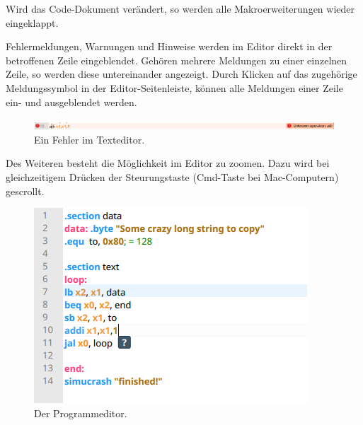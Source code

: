 Wird das Code-Dokument verändert, so werden alle Makroerweiterungen wieder
eingeklappt.

Fehlermeldungen, Warnungen und Hinweise werden im Editor direkt in der
betroffenen Zeile eingeblendet. Gehören mehrere Meldungen zu einer einzelnen
Zeile, so werden diese untereinander angezeigt. Durch Klicken auf das zugehörige
Meldungssymbol in der Editor-Seitenleiste, können alle Meldungen einer Zeile
ein- und ausgeblendet werden.

\begin{figure}[ht]
	\centering
  \includegraphics[width=\textwidth]{Images/Editor_error}
	\caption{Ein Fehler im Texteditor.}
	\label{Editor_Error}
\end{figure}

Des Weiteren besteht die Möglichkeit im Editor zu zoomen. Dazu wird bei
gleichzeitigem Drücken der Steurungstaste (Cmd-Taste bei Mac-Computern)
gescrollt.

\begin{figure}[ht]
	\centering
  \includegraphics[scale=1]{Images/Editor}
	\caption{Der Programmeditor.}
	\label{Editor}
\end{figure}


